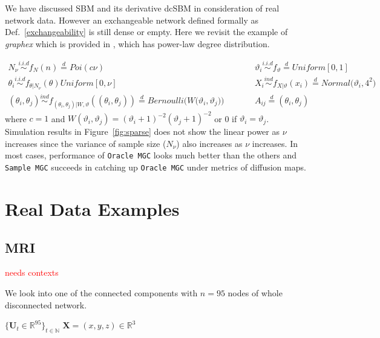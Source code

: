 \documentclass[12pt]{article}
\theoremstyle{definition}
\begin{document}
We have discussed SBM and its derivative dcSBM in consideration of real network data. However an exchangeable network defined formally as Def.~\ref{exchangeability} is still dense or empty. Here we revisit the example of \textit{graphex} which is provided in \cite{veitch2015class}, which has power-law degree distribution.

\begin{eqnarray}
		 N_{\nu} \overset{i.i.d}{\sim} f_{N}(n)   \stackrel{d}{=} Poi( c \nu)  &   \quad \quad &
		\vartheta_{i}  \overset{i.i.d}{\sim} f_{\vartheta} \stackrel{d}{=} Uniform[0,1] \\
		 \theta_{i} \overset{i.i.d}{\sim} f_{\theta |  N_{\nu}} (\theta)     Uniform[0, \nu]  & \quad \quad  & X_{i}    \overset{ind}{\sim} f_{X | \vartheta}(x_{i}) \stackrel{d}{=} Normal \big( \vartheta_{i}, 4^2 \big)  \\ 
		(\theta_{i}, \theta_{j})  \overset{ind}{\sim} f_{ (\theta_{i}, \theta_{j})  | W, \vartheta} ( (\theta_{i}, \theta_{j}) ) \stackrel{d}{=}   Bernoulli \big( W\big( \vartheta_{i}, \vartheta_{j} \big) \big)  &  \quad \quad & A_{ij}  \stackrel{d}{=} (\theta_{i}, \theta_{j})
\label{eq:sparse}		 
\end{eqnarray}	
where $c = 1$ and $W(\vartheta_{i}, \vartheta_{j} ) = (\vartheta_{i} + 1)^{-2} ( \vartheta_{j} + 1 )^{-2}$ or 0 if $\vartheta_{i} = \vartheta_{j}$. 
Simulation results in Figure~\ref{fig:sparse} does not show the linear power as $\nu$ increases since the variance of sample size ($N_{\nu}$) also increases as $\nu$ increases. In most cases, performance of \texttt{Oracle MGC} looks much better than the others and \texttt{Sample MGC} succeeds in catching up \texttt{Oracle MGC} under metrics of diffusion maps. 


\section{Real Data Examples}
\label{sec:real}
	
\subsection{MRI}
	
\textcolor{red}{needs contexts}	
	
We look into one of the connected components with $n = 95$ nodes of whole disconnected network. 
	
$\{ \mathbf{U}_{t} \in \mathbb{R}^{95} \}_{t \in \mathbb{N}}$ $\mathbf{X} = (x,y,z) \in \mathbb{R}^{3}$
	
\end{document}
